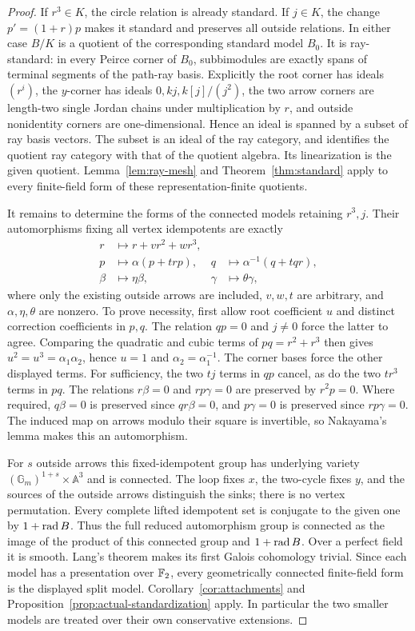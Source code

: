 \begin{proof}
If $r^3\in K$, the circle relation is already standard. If $j\in K$, the change $p'=(1+r)p$ makes it standard and preserves all outside relations. In either case $B/K$ is a quotient of the corresponding standard model $B_0$. It is ray-standard: in every Peirce corner of $B_0$, subbimodules are exactly spans of terminal segments of the path-ray basis. Explicitly the root corner has ideals $(r^i)$, the $y$-corner has ideals $0,kj,k[j]/(j^2)$, the two arrow corners are length-two single Jordan chains under multiplication by $r$, and outside nonidentity corners are one-dimensional. Hence an ideal is spanned by a subset of ray basis vectors. The subset is an ideal of the ray category, and \cite[Proposition 2(c)]{Bongartz13} identifies the quotient ray category with that of the quotient algebra. Its linearization is the given quotient. Lemma~\ref{lem:ray-mesh} and Theorem~\ref{thm:standard} apply to every finite-field form of these representation-finite quotients.

It remains to determine the forms of the connected models retaining $r^3,j$. Their automorphisms fixing all vertex idempotents are exactly
\begin{align*}
 r&\longmapsto r+vr^2+wr^3,\\
 p&\longmapsto\alpha(p+trp),&
 q&\longmapsto\alpha^{-1}(q+tqr),\\
 \beta&\longmapsto\eta\beta,&
 \gamma&\longmapsto\theta\gamma,
\end{align*}
where only the existing outside arrows are included, $v,w,t$ are arbitrary, and $\alpha,\eta,\theta$ are nonzero. To prove necessity, first allow root coefficient $u$ and distinct correction coefficients in $p,q$. The relation $qp=0$ and $j\ne0$ force the latter to agree. Comparing the quadratic and cubic terms of $pq=r^2+r^3$ then gives $u^2=u^3=\alpha_1\alpha_2$, hence $u=1$ and $\alpha_2=\alpha_1^{-1}$. The corner bases force the other displayed terms. For sufficiency, the two $t j$ terms in $qp$ cancel, as do the two $tr^3$ terms in $pq$. The relations $r\beta=0$ and $rp\gamma=0$ are preserved by $r^2p=0$. Where required, $q\beta=0$ is preserved since $qr\beta=0$, and $p\gamma=0$ is preserved since $rp\gamma=0$. The induced map on arrows modulo their square is invertible, so Nakayama's lemma makes this an automorphism.

For $s$ outside arrows this fixed-idempotent group has underlying variety $(\mathbb G_m)^{1+s}\times\mathbb A^3$ and is connected. The loop fixes $x$, the two-cycle fixes $y$, and the sources of the outside arrows distinguish the sinks; there is no vertex permutation. Every complete lifted idempotent set is conjugate to the given one by $1+\operatorname{rad} B$. Thus the full reduced automorphism group is connected as the image of the product of this connected group and $1+\operatorname{rad} B$. Over a perfect field it is smooth. Lang's theorem \cite{Lang} makes its first Galois cohomology trivial. Since each model has a presentation over $\mathbb F_2$, every geometrically connected finite-field form is the displayed split model. Corollary~\ref{cor:attachments} and Proposition~\ref{prop:actual-standardization} apply. In particular the two smaller models are treated over their own conservative extensions.


\end{proof}
